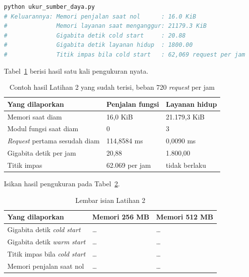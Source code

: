 \begin{lstlisting}[language=bash, caption={Mengukur \textit{idle cost}, skrip
  tersedia di \berkas{sources/chapter14/ukur_sumber_daya.py}},
  label=lst:jalankan-diam]
python ukur_sumber_daya.py
# Keluarannya: Memori penjalan saat nol      : 16.0 KiB
#              Memori layanan saat menganggur: 21179.3 KiB
#              Gigabita detik cold start     : 20.88
#              Gigabita detik layanan hidup  : 1800.00
#              Titik impas bila cold start   : 62,069 request per jam
\end{lstlisting}

Tabel~\ref{tab:lat2serverless-contoh} berisi hasil satu kali pengukuran nyata.

\begin{table}[htbp]
  \centering
  \caption{Contoh hasil Latihan 2 yang sudah terisi, beban 720 \textit{request} per
    jam}
  \label{tab:lat2serverless-contoh}
  \begin{tabularx}{\textwidth}{|X|l|l|}
    \hline
    \textbf{Yang dilaporkan} & \textbf{Penjalan fungsi} & \textbf{Layanan hidup} \\
    \hline
    Memori saat diam & 16,0 KiB & 21.179,3 KiB \\
    \hline
    Modul fungsi saat diam & 0 & 3 \\
    \hline
    \textit{Request} pertama sesudah diam & 114,8584 ms & 0,0090 ms \\
    \hline
    Gigabita detik per jam & 20,88 & 1.800,00 \\
    \hline
    Titik impas & 62.069 per jam & tidak berlaku \\
    \hline
  \end{tabularx}
\end{table}

Isikan hasil pengukuran pada Tabel~\ref{tab:lat2serverless-hasil}.

\begin{table}[htbp]
  \centering
  \caption{Lembar isian Latihan 2}
  \label{tab:lat2serverless-hasil}
  \begin{tabularx}{\textwidth}{|X|l|l|}
    \hline
    \textbf{Yang dilaporkan} & \textbf{Memori 256 MB} & \textbf{Memori 512 MB} \\
    \hline
    Gigabita detik \textit{cold start} & \dots & \dots \\
    \hline
    Gigabita detik \textit{warm start} & \dots & \dots \\
    \hline
    Titik impas bila \textit{cold start} & \dots & \dots \\
    \hline
    Memori penjalan saat nol & \dots & \dots \\
    \hline
  \end{tabularx}
\end{table}

